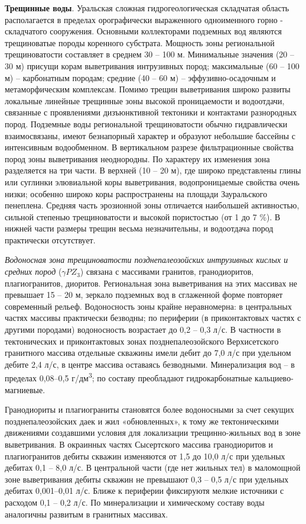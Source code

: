 \textbf{Трещинные воды}. Уральская сложная гидрогеологическая складчатая область располагается в пределах орографически выраженного одноименного горно - складчатого сооружения. Основными коллекторами подземных вод являются трещиноватые породы коренного субстрата. Мощность зоны региональной трещиноватости составляет в среднем 30 – 100 м. Минимальные значения (20 – 30 м) присущи корам выветривания интрузивных пород; максимальные (60 – 100 м) – карбонатным породам; средние (40 – 60 м) – эффузивно-осадочным и метаморфическим комплексам. Помимо трещин выветривания широко развиты локальные линейные трещинные зоны высокой проницаемости и водоотдачи, связанные с проявлениями дизъюнктивной тектоники и контактами разнородных пород. Подземные воды региональной трещиноватости обычно гидравлически взаимосвязаны, имеют безнапорный характер и образуют небольшие бассейны с интенсивным
водообменном. В вертикальном разрезе фильтрационные свойства пород зоны выветривания неоднородны. По характеру их изменения зона разделяется на три части. В верхней (10 – 20 м), где широко представлены глины или суглинки элювиальной коры выветривания, водопроницаемые свойства очень низки; особенно широко коры распространены на площади Зауральского пенеплена. Средняя часть эрозионной зоны отличается наибольшей активностью, сильной степенью трещиноватости и высокой пористостью (от 1 до 7 \%). В нижней части размеры трещин весьма незначительны, и водоотдача пород практически отсутствует.

\textit{Водоносная зона трещиноватости позднепалеозойских интрузивных кислых и средних пород} ($\gamma PZ_3$) связана с массивами гранитов, гранодиоритов, плагиогранитов, диоритов. Региональная зона выветривания на этих массивах не превышает 15 – 20 м, зеркало подземных вод в сглаженной форме повторяет современный рельеф. Водоносность зоны крайне неравномерна: в центральных частях массивы практически безводны; по периферии (в приконтактовых частях с другими породами) водоносность возрастает до 0,2 – 0,3 л/с. В частности в тектонических и приконтактовых зонах позднепалеозойского Верхисетского гранитного массива отдельные скважины имели дебит до 7,0 л/с при удельном дебите 2,4 л/с, в центре массива оставаясь безводными. Минерализация вод – в пределах 0,08–0,5 г/дм\textsuperscript{3}; по составу преобладают гидрокарбонатные  кальциево-магниевые.

Гранодиориты и плагиограниты становятся более водоносными за счет секущих позднепалеозойских даек и жил «обновленных», к тому же тектоническими движениями создавшими условия для локализации трещинно-жильных вод в зоне выветривания. В окраинных частях Сысертского массива гранодиоритов и плагиогранитов дебиты скважин изменяются от 1,5 до 10,0 л/с при удельных дебитах 0,1 – 8,0 л/с. В центральной части (где нет жильных тел) в маломощной зоне выветривания дебиты скважин не превышают 0,3 – 0,5 л/с при удельных дебитах 0,001–0,01 л/с. Ближе к периферии фиксируютя мелкие источники с расходом 0,1 – 0,2 л/с. По минерализации и химическому составу воды аналогичны развитым в гранитных массивах. 

